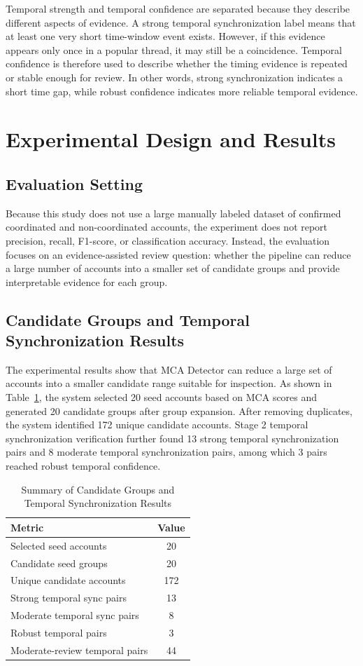 \documentclass[conference]{IEEEtran}
\begin{document}
Temporal strength and temporal confidence are separated because they describe different aspects of evidence. A strong temporal synchronization label means that at least one very short time-window event exists. However, if this evidence appears only once in a popular thread, it may still be a coincidence. Temporal confidence is therefore used to describe whether the timing evidence is repeated or stable enough for review. In other words, strong synchronization indicates a short time gap, while robust confidence indicates more reliable temporal evidence.

\section{Experimental Design and Results}
\subsection{Evaluation Setting}
Because this study does not use a large manually labeled dataset of confirmed coordinated and non-coordinated accounts, the experiment does not report precision, recall, F1-score, or classification accuracy. Instead, the evaluation focuses on an evidence-assisted review question: whether the pipeline can reduce a large number of accounts into a smaller set of candidate groups and provide interpretable evidence for each group.

\subsection{Candidate Groups and Temporal Synchronization Results}
The experimental results show that MCA Detector can reduce a large set of accounts into a smaller candidate range suitable for inspection. As shown in Table~\ref{tab:results}, the system selected 20 seed accounts based on MCA scores and generated 20 candidate groups after group expansion. After removing duplicates, the system identified 172 unique candidate accounts. Stage 2 temporal synchronization verification further found 13 strong temporal synchronization pairs and 8 moderate temporal synchronization pairs, among which 3 pairs reached robust temporal confidence.

\begin{table}[htbp]
\caption{Summary of Candidate Groups and Temporal Synchronization Results}
\label{tab:results}
\centering
\begin{tabular}{lc}
\toprule
\textbf{Metric} & \textbf{Value} \\
\midrule
Selected seed accounts & 20 \\
Candidate seed groups & 20 \\
Unique candidate accounts & 172 \\
Strong temporal sync pairs & 13 \\
Moderate temporal sync pairs & 8 \\
Robust temporal pairs & 3 \\
Moderate-review temporal pairs & 44 \\
\bottomrule
\end{tabular}
\end{table}
\end{document}
